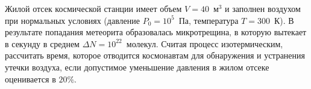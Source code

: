 
Жилой отсек космической станции имеет объем $V=40$~м$^3$ и заполнен воздухом при нормальных условиях (давление $P_0=10^5$~Па, температура $T=300$~К). 
В результате попадания метеорита образовалась микротрещина, в которую вытекает в секунду в среднем $\Delta N=10^{22}$~молекул. Считая процесс изотермическим, 
рассчитать время, которое отводится космонавтам для обнаружения и устранения утечки воздуха, если допустимое уменьшение давления в жилом отсеке оценивается в $20\%$. 